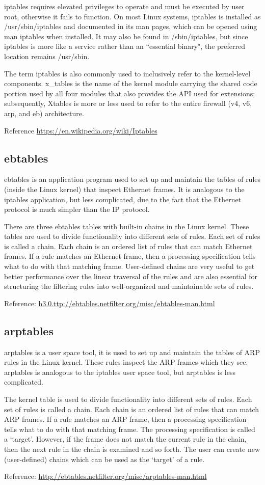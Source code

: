 \documentclass{article}
\begin{document}
iptables requires elevated privileges to operate and must be executed by user root, otherwise it fails to function. On most Linux systems, iptables is installed as /usr/sbin/iptables and documented in its man pages, which can be opened using man iptables when installed. It may also be found in /sbin/iptables, but since iptables is more like a service rather than an ``essential binary", the preferred location remains /usr/sbin.

The term iptables is also commonly used to inclusively refer to the kernel-level components. x\_tables is the name of the kernel module carrying the shared code portion used by all four modules that also provides the API used for extensions; subsequently, Xtables is more or less used to refer to the entire firewall (v4, v6, arp, and eb) architecture.

Reference \url{https://en.wikipedia.org/wiki/Iptables}

\subsection*{ebtables}
ebtables is an application program used to set up and maintain the tables of rules (inside the Linux kernel) that inspect Ethernet frames. It is analogous to the iptables application, but less complicated, due to the fact that the Ethernet protocol is much simpler than the IP protocol.  

There are three ebtables tables with built-in chains in the Linux kernel. These tables are used to divide functionality into different sets of rules. Each set of rules is called a chain. Each chain is an ordered list of rules that can match Ethernet frames. If a rule matches an Ethernet frame, then a processing specification tells what to do with that matching frame. User-defined chains are very useful to get better performance over the linear traversal of the rules and are also essential for structuring the filtering rules into well-organized and maintainable sets of rules.  

Reference: \url{h3.0.ttp://ebtables.netfilter.org/misc/ebtables-man.html}

\subsection*{arptables}
arptables is a user space tool, it is used to set up and maintain the tables of ARP rules in the Linux kernel. These rules inspect the ARP frames which they see. arptables is analogous to the iptables user space tool, but arptables is less complicated.

The kernel table is used to divide functionality into different sets of rules. Each set of rules is called a chain. Each chain is an ordered list of rules that can match ARP frames. If a rule matches an ARP frame, then a processing specification tells what to do with that matching frame. The processing specification is called a `target'. However, if the frame does not match the current rule in the chain, then the next rule in the chain is examined and so forth. The user can create new (user-defined) chains which can be used as the `target' of a rule.

Reference: \url{http://ebtables.netfilter.org/misc/arptables-man.html}
\end{document}
